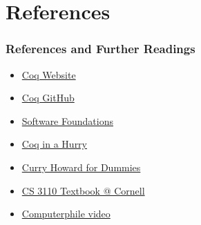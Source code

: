 \documentclass{beamer}
\begin{document}
\section{References}
\begin{frame}
\frametitle{References and Further Readings}
    \begin{itemize}
        \item \href{https://coq.inria.fr/}{Coq Website}
        \item \href{https://github.com/coq/coq}{Coq GitHub}
        \item \href{https://softwarefoundations.cis.upenn.edu/lf-current/toc.html}{Software Foundations}
        \item \href{https://cel.hal.science/inria-00001173v6/document}{Coq in a Hurry}
        \item \href{https://www.rocq.inria.fr/semdoc/Presentations/20150217_PierreMariePedrot.pdf}{Curry Howard for Dummies}
        \item \href{https://cs3110.github.io/textbook/chapters/adv/curry-howard.html}{CS 3110 Textbook @ Cornell}
        \item \href{https://youtu.be/SknxggwRPzU}{Computerphile video}
    \end{itemize}
\end{frame}
\end{document}

